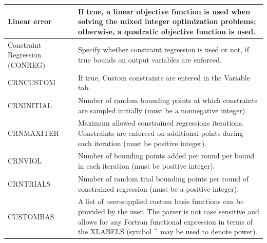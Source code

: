 \begin{center}
\begin{longtable}{|p{}|p{} |}
			Linear error & If true, a linear objective function is used when solving the mixed integer optimization problems; otherwise, a quadratic objective function is used. \\ \hline
			\raggedright{Constraint Regression (CONREG)} & Specify whether constraint regression is used or not, if true bounds on output variables are enforced. \\ \hline
			CRNCUSTOM & If true, Custom constraints are entered in the Variable tab.\\ \hline
			CRNINITIAL& Number of random bounding points at which constraints are sampled initially (must be a nonnegative integer). \\ \hline
			CRNMAXITER & Maximum allowed constrained regressions iterations. Constraints are enforced on additional points during each iteration (must be positive integer). \\ \hline
			CRNVIOL & Number of bounding points added per round per bound in each iteration (must be positive integer). \\ \hline
			CRNTRIALS&Number of random trial bounding points per round of constrained regression (must be a positive integer). \\ \hline
			CUSTOMBAS&A list of user-supplied custom basis functions can be provided by the user. The parser is not case sensitive and allows for any Fortran functional expression in terms of the XLABELS (symbol \^{} may be used to denote power). \\ \hline
			

\end{longtable}	
\end{center}	
